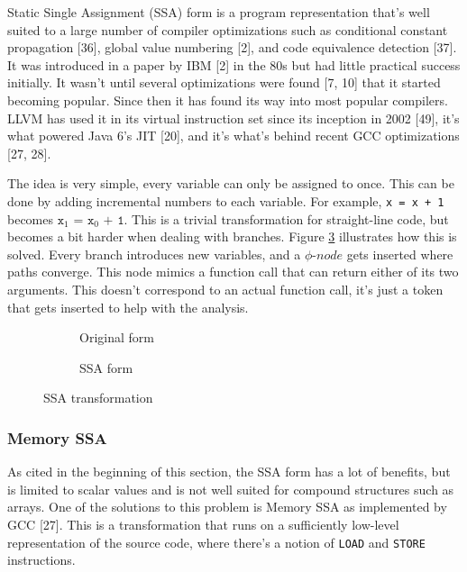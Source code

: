 \documentclass[a4paper, 16pt, oneside]{Thesis}
\begin{document}
Static Single Assignment (SSA) form is a program representation that's
well suited to a large number of compiler optimizations such as
conditional constant propagation {[}36{]}, global value numbering
{[}2{]}, and code equivalence detection {[}37{]}. It was introduced in a
paper by IBM {[}2{]} in the 80s but had little practical success
initially. It wasn't until several optimizations were found {[}7, 10{]}
that it started becoming popular. Since then it has found its way into
most popular compilers. LLVM has used it in its virtual instruction set
since its inception in 2002 {[}49{]}, it's what powered Java 6's JIT
{[}20{]}, and it's what's behind recent GCC optimizations {[}27, 28{]}.

The idea is very simple, every variable can only be assigned to once.
This can be done by adding incremental numbers to each variable. For
example, \texttt{x\ =\ x\ +\ 1} becomes
\(\texttt{x}_1 \texttt{ = x}_0 \texttt{ + 1}\). This is a trivial
transformation for straight-line code, but becomes a bit harder when
dealing with branches. Figure \ref{fig:ssa} illustrates how this is
solved. Every branch introduces new variables, and a
\(\phi\textit{-node}\) gets inserted where paths converge. This node
mimics a function call that can return either of its two arguments. This
doesn't correspond to an actual function call, it's just a token that
gets inserted to help with the analysis.

\begin{figure}
    \centering
    \begin{subfigure}[t]{0.44\textwidth}
      \resizebox{\linewidth}{!}{}
      \caption{Original form}
      \label{fig:ssa_before}
  \end{subfigure}
    \begin{subfigure}[t]{0.55\textwidth}
      \resizebox{\linewidth}{!}{}
        \caption{SSA form}
        \label{fig:ssa_after}
    \end{subfigure}
    \caption{SSA transformation}
    \label{fig:ssa}
\end{figure}

\subsubsection{Memory SSA}\label{memory-ssa}

As cited in the beginning of this section, the SSA form has a lot of
benefits, but is limited to scalar values and is not well suited for
compound structures such as arrays. One of the solutions to this problem
is Memory SSA as implemented by GCC {[}27{]}. This is a transformation
that runs on a sufficiently low-level representation of the source code,
where there's a notion of \texttt{LOAD} and \texttt{STORE} instructions.
\end{document}
